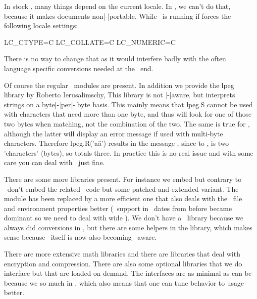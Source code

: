 \stopsubsection

\startsubsection[title={Locales}]

In stock \LUA, many things depend on the current locale. In \LUAMETATEX, we can't
do that, because it makes documents non|-|portable. While \LUAMETATEX\ is running
if forces the following locale settings:

\starttyping
LC_CTYPE=C
LC_COLLATE=C
LC_NUMERIC=C
\stoptyping

There is no way to change that as it would interfere badly with the often
language specific conversions needed at the \TEX\ end.

\stopsubsection

\stopsection

\startsection[title={\LUA\ modules}]

Of course the regular \LUA\ modules are present. In addition we provide the \type
{lpeg} library by Roberto Ierusalimschy, This library is not \UNICODE|-|aware,
but interprets strings on a byte|-|per|-|byte basis. This mainly means that \type
{lpeg.S} cannot be used with  characters that need more than one byte, and
thus  will look for one of those two bytes when matching, not the
combination of the two. The same is true for , although the latter
will display an error message if used with multi-byte characters. Therefore \type
{lpeg.R('aä')} results in the message , since to ,  is two 'characters'
(bytes), so  totals three. In practice this is no real issue and with
some care you can deal with \UNICODE\ just fine.

There are some more libraries present. For instance we embed 
but contrary to \LUATEX\ don't embed the related \LUA\ code but some patched and
extended variant. The  module has been replaced by a more
efficient one that also deals with the \MSWINDOWS\ file and environment
properties better (\UNICODE\ support in \MSWINDOWS\ dates from before 
became dominant so we need to deal with wide ). We don't have a
\UNICODE\ library because we always did conversions in \LUA, but there are some
helpers in the  library, which makes sense because \LUA\ itself is
now also becoming \UNICODE\ aware.

There are more extensive math libraries and there are libraries that deal with
encryption and compression. There are also some optional libraries that we do
interface but that are loaded on demand. The interfaces are as minimal as can be
because we so much in \LUA, which also means that one can tune behavior to usage
better.

